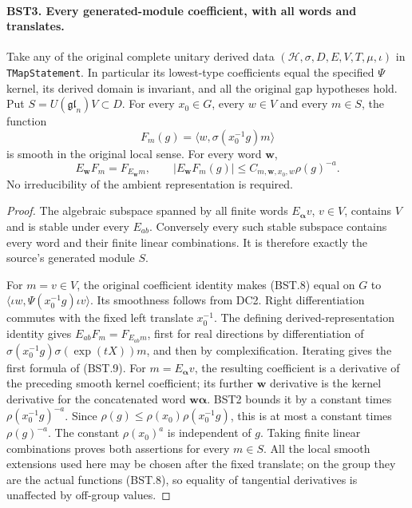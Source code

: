 \documentclass[11pt,a4paper]{article}
\numberwithin{equation}{section}
\theoremstyle{remark}\newtheorem{remark}[theorem]{Remark}
\begin{document}
\paragraph{BST3. Every generated-module coefficient, with all words and translates.}
\label{claim:BST3}
Take any of the original complete unitary derived data
$(\mathcal H,\sigma,D,E,V,T,\mu,\iota)$ in
\texttt{TMap\allowbreak Statement}.  In particular its lowest-type coefficients
equal the specified $\Psi$ kernel, its derived domain is invariant,
and all the original gap hypotheses hold.
Put $S=U(\mathfrak{gl}_n)V\subset D$.
For every $x_0\in G$, every $w\in V$ and every $m\in S$, the
function
\[
 F_m(g)=\langle w,\sigma(x_0^{-1}g)m\rangle
 \tag{BST.8}
\]
is smooth in the original local sense.  For every word $\mathbf w$,
\[
 E_{\mathbf w}F_m=F_{E_{\mathbf w}m},\qquad
 |E_{\mathbf w}F_m(g)|\le C_{m,\mathbf w,x_0,w}\rho(g)^{-a}.
 \tag{BST.9}
\]
No irreducibility of the ambient representation is required.

\begin{proof}
The algebraic subspace spanned by all finite words $E_{\boldsymbol\alpha}v$,
$v\in V$, contains $V$ and is stable under every $E_{ab}$.
Conversely every such stable subspace contains every word and their
finite linear combinations.  It is therefore exactly the source's
generated module $S$.

For $m=v\in V$, the original coefficient identity makes (BST.8)
equal on $G$ to
$\langle\iota w,\Psi(x_0^{-1}g)\iota v\rangle$.
Its smoothness follows from DC2.  Right differentiation commutes with
the fixed left translate $x_0^{-1}$.
The defining derived-representation identity gives
$E_{ab}F_m=F_{E_{ab}m}$, first for real directions by differentiation
of $\sigma(x_0^{-1}g)\sigma(\exp(tX))m$, and then by complexification.
Iterating gives the first formula of (BST.9).
For $m=E_{\boldsymbol\alpha}v$, the resulting coefficient is a
derivative of the preceding smooth kernel coefficient; its further
$\mathbf w$ derivative is the kernel derivative for the concatenated
word $\mathbf w\boldsymbol\alpha$.
BST2 bounds it by a constant times $\rho(x_0^{-1}g)^{-a}$.
Since $\rho(g)\le\rho(x_0)\rho(x_0^{-1}g)$, this is at most a
constant times $\rho(g)^{-a}$.  The constant $\rho(x_0)^a$ is
independent of $g$.
Taking finite linear combinations proves both assertions for every
$m\in S$.  All the local smooth extensions used here may be chosen
after the fixed translate; on the group they are the actual functions
(BST.8), so equality of tangential derivatives is unaffected by
off-group values.
\end{proof}
\end{document}
